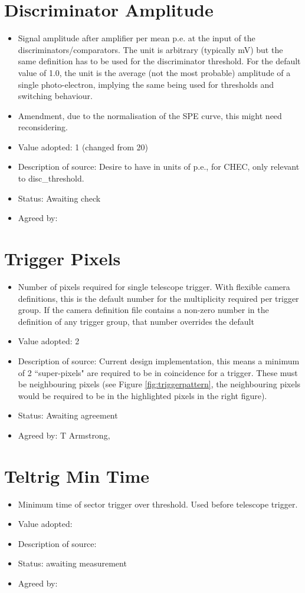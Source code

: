 \documentclass[GCT,short]{gct}
\begin{document}
\section{Discriminator Amplitude}
\begin{itemize}
\item Signal amplitude after amplifier per mean p.e. at the input of the discriminators/comparators. The unit is arbitrary (typically mV) but the same definition has to be used for the discriminator threshold. For the default value of 1.0, the unit is the average (not the most probable) amplitude of a single photo-electron, implying the same being used for thresholds and switching behaviour.
\item Amendment, due to the normalisation of the SPE curve, this might need reconsidering. 
\item Value adopted: 1 (changed from 20)
\item Description of source: Desire to have in units of p.e., for CHEC, only relevant to disc\_threshold.
\item Status: \color{orange}Awaiting check\color{black}
\item Agreed by: 
\end{itemize}


\section{Trigger Pixels }
\begin{itemize}
\item Number of pixels required for single telescope trigger. With flexible camera definitions, this is the default number for the multiplicity required per trigger group. If the camera definition file contains a non-zero number in the definition of any trigger group, that number overrides the default
\item Value adopted: 2
\item Description of source: Current design implementation, this means a minimum of 2 ``super-pixels" are required to be in coincidence for a trigger. These must be neighbouring pixels (see Figure \ref{fig:triggerpattern}, the neighbouring pixels would be required to be in the highlighted pixels in the right figure).
\item Status: \color{orange}Awaiting agreement\color{black}
\item Agreed by: T Armstrong, 
\end{itemize}


\section{Teltrig Min Time}
\begin{itemize}
\item Minimum time of sector trigger over threshold. Used before telescope trigger.
\item Value adopted: 
\item Description of source: 
\item Status: \color{red}awaiting measurement\color{black}
\item Agreed by: 
\end{itemize}
\end{document}

